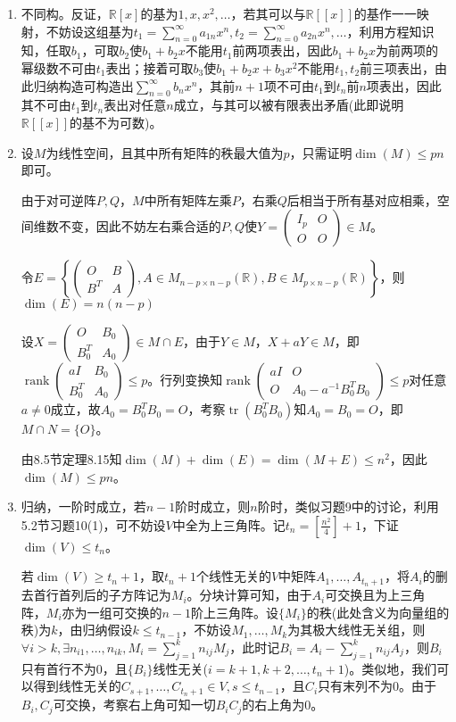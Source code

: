 \documentclass[a4paper,UTF8,fontset=windows]{ctexart}
\DeclareMathOperator{\rank}{rank}
\DeclareMathOperator{\tr}{tr}
\begin{document}
\begin{enumerate}
\item
不同构。反证，$\mathbb{R}[x]$的基为$1,x,x^2,\dots$，若其可以与$\mathbb{R}[[x]]$的基作一一映射，不妨设这组基为$t_1=\sum_{n=0}^\infty a_{1n}x^n,t_2=\sum_{n=0}^\infty a_{2n}x^n,\dots$，利用方程知识知，任取$b_1$，可取$b_2$使$b_1+b_2x$不能用$t_1$前两项表出，因此$b_1+b_2x$为前两项的幂级数不可由$t_1$表出；接着可取$b_3$使$b_1+b_2x+b_3x^2$不能用$t_1,t_2$前三项表出，由此归纳构造可构造出$\sum_{n=0}^\infty b_{n}x^n$，其前$n+1$项不可由$t_1$到$t_n$前$n$项表出，因此其不可由$t_1$到$t_n$表出对任意$n$成立，与其可以被有限表出矛盾(此即说明$\mathbb{R}[[x]]$的基不为可数)。

\item
设$M$为线性空间，且其中所有矩阵的秩最大值为$p$，只需证明$\dim(M)\le pn$即可。

由于对可逆阵$P,Q$，$M$中所有矩阵左乘$P$，右乘$Q$后相当于所有基对应相乘，空间维数不变，因此不妨左右乘合适的$P,Q$使$Y=\begin{pmatrix}I_p&O\\O&O\end{pmatrix}\in M$。

令$E=\left\{\begin{pmatrix}O&B\\B^T&A\end{pmatrix},A\in M_{n-p\times n-p}(\mathbb{R}),B\in M_{p\times n-p}(\mathbb{R})\right\}$，则$\dim(E)=n(n-p)$

设$X=\begin{pmatrix}O&B_0\\B_0^T&A_0\end{pmatrix}\in M\cap E$，由于$Y\in M$，$X+aY\in M$，即$\rank\begin{pmatrix}aI&B_0\\B_0^T&A_0\end{pmatrix}\le p$。行列变换知$\rank\begin{pmatrix}aI&O\\O&A_0-a^{-1}B_0^TB_0\end{pmatrix}\le p$对任意$a\ne0$成立，故$A_0=B_0^TB_0=O$，考察$\tr(B_0^TB_0)$知$A_0=B_0=O$，即$M\cap N=\{O\}$。

由8.5节定理8.15知$\dim(M)+\dim(E)=\dim(M+E)\le n^2$，因此$\dim(M)\le pn$。

\item
归纳，一阶时成立，若$n-1$阶时成立，则$n$阶时，类似习题9中的讨论，利用5.2节习题10(1)，可不妨设$V$中全为上三角阵。记$t_n=\left[\frac{n^2}{4}\right]+1$，下证$\dim(V)\le t_n$。

若$\dim(V)\ge t_n+1$，取$t_n+1$个线性无关的$V$中矩阵$A_1,\dots,A_{t_n+1}$，将$A_i$的删去首行首列后的子方阵记为$M_i$。分块计算可知，由于$A_i$可交换且为上三角阵，$M_i$亦为一组可交换的$n-1$阶上三角阵。设$\{M_i\}$的秩(此处含义为向量组的秩)为$k$，由归纳假设$k\le t_{n-1}$，不妨设$M_1,\dots,M_k$为其极大线性无关组，则$\forall i>k, \exists n_{i1},\dots,n_{ik}, M_i=\sum_{j=1}^kn_{ij}M_j$，此时记$B_i=A_i-\sum_{j=1}^kn_{ij}A_j$，则$B_i$只有首行不为0，且$\{B_i\}$线性无关($i=k+1,k+2,\dots,t_n+1$)。类似地，我们可以得到线性无关的$C_{s+1},\dots,C_{t_n+1}\in V,s\le t_{n-1}$，且$C_i$只有末列不为0。由于$B_i,C_j$可交换，考察右上角可知一切$B_iC_j$的右上角为0。


\end{enumerate}
\end{document}
